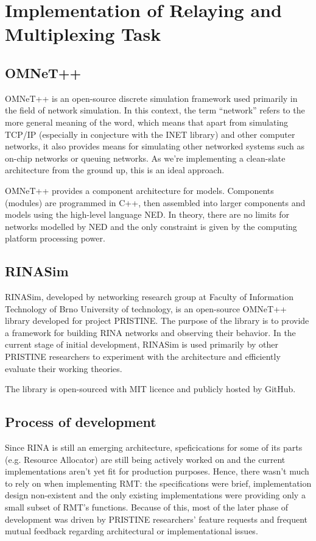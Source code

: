 \chapter{Implementation of Relaying and Multiplexing Task}\label{implementation}

    \section{OMNeT++}

        OMNeT++ is an open-source discrete simulation framework used primarily in the field of network simulation. In this context, the term ``network'' refers to the more general meaning of the word, which means that apart from simulating TCP/IP (especially in conjecture with the INET library) and other computer networks, it also provides means for simulating other networked systems such as on-chip networks or queuing networks. As we're implementing a clean-slate architecture from the ground up, this is an ideal approach.

        OMNeT++ provides a component architecture for models. Components (modules) are programmed in C++, then assembled into larger components and models using the high-level language NED. In theory, there are no limits for networks modelled by NED and the only constraint is given by the computing platform processing power.

    \section{RINASim}

        RINASim, developed by networking research group at Faculty of Information Technology of Brno University of technology, is an open-source OMNeT++ library developed for project PRISTINE. The purpose of the library is to provide a framework for building RINA networks and observing their behavior. In the current stage of initial development, RINASim is used primarily by other PRISTINE researchers to experiment with the architecture and efficiently evaluate their working theories.

        The library is open-sourced with MIT licence and publicly hosted by GitHub.

    \section{Process of development}

        Since RINA is still an emerging architecture, speficications for some of its parts (e.g. Resource Allocator) are still being actively worked on and the current implementations aren't yet fit for production purposes. Hence, there wasn't much to rely on when implementing RMT: the specifications were brief, implementation design non-existent and the only existing implementations were providing only a small subset of RMT's functions. Because of this, most of the later phase of development was driven by PRISTINE researchers' feature requests and frequent mutual feedback regarding architectural or implementational issues.

